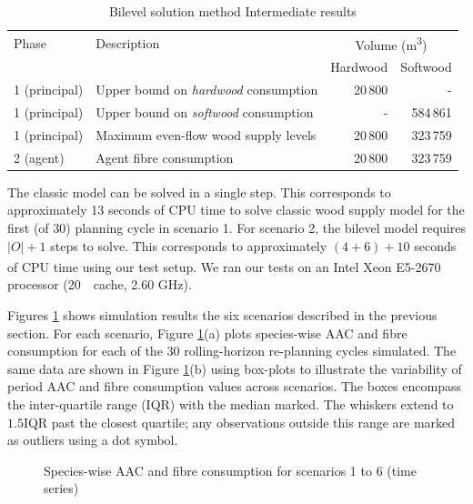 \begin{table}
\caption{Bilevel solution method Intermediate results}
\label{tab:scenarios}
\renewcommand{\tabcolsep}{2pt}
\begin{tabular}{llrr}
\toprule 
Phase & Description & \multicolumn{2}{c}{Volume (\si{\cubic\metre})} \tabularnewline
&& Hardwood & Softwood \tabularnewline
\midrule
1 (principal) & Upper bound on \emph{hardwood} consumption & 20\,800 & - \tabularnewline
1 (principal) & Upper bound on \emph{softwood} consumption & - & 584\,861 \tabularnewline
1 (principal) & Maximum even-flow wood supply levels & 20\,800 & 323\,759 \tabularnewline
2 (agent) & Agent fibre consumption & 20\,800 & 323\,759 \tabularnewline
\bottomrule
\end{tabular}
\end{table}

The classic model can be solved in a single step.
This corresponds to approximately 13 seconds of CPU time to solve classic wood supply model for the first (of 30) planning cycle in scenario 1.
For scenario 2, the bilevel model requires $\left|O\right| + 1$ steps to solve.
This corresponds to approximately $(4 + 6) + 10$ seconds of CPU time using our test setup.
We ran our tests on an Intel\textsuperscript{\textregistered} Xeon\textsuperscript{\textregistered} E5-2670 processor (20\,\si{\mega\byte} cache, 2.60 \si{\giga\hertz}).

Figures \ref{fig:scenarios} shows simulation results the six scenarios described in the previous section. For each scenario, Figure \ref{fig:scenarios}(a) plots species-wise AAC and fibre consumption for each of the 30 rolling-horizon re-planning cycles simulated. The same data are shown in Figure \ref{fig:scenarios}(b) using box-plots to illustrate the variability of period AAC and fibre consumption values across scenarios. The boxes encompass the inter-quartile range (IQR) with the median marked. The whiskers extend to $1.5 \text{IQR}$ past the closest quartile; any observations outside this range are marked as outliers using a dot symbol.


\begin{figure}%
  \centering
  \caption{Species-wise AAC and fibre consumption for scenarios 1 to 6 (time series)}%
  \label{fig:scenarios}%
\end{figure}

